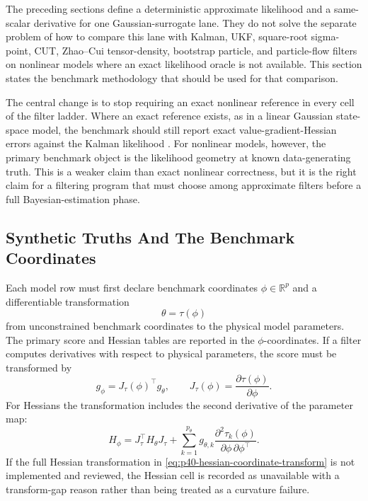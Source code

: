 \documentclass[11pt]{article}
\numberwithin{equation}{section}
\newcommand{\R}{\mathbb R}
\begin{document}
The preceding sections define a deterministic approximate likelihood and a
same-scalar derivative for one Gaussian-surrogate lane.  They do not solve the
separate problem of how to compare this lane with Kalman, UKF, square-root
sigma-point, CUT, Zhao--Cui tensor-density, bootstrap particle, and
particle-flow filters on nonlinear models where an exact likelihood oracle is
not available.  This section states the benchmark methodology that should be
used for that comparison.

The central change is to stop requiring an exact nonlinear reference in every
cell of the filter ladder.  Where an exact reference exists, as in a linear
Gaussian state-space model, the benchmark should still report exact
value-gradient-Hessian errors against the Kalman likelihood
\citep{durbin2012time}.  For nonlinear models, however, the primary benchmark
object is the likelihood geometry at known data-generating truth.  This is a
weaker claim than exact nonlinear correctness, but it is the right claim for a
filtering program that must choose among approximate filters before a full
Bayesian-estimation phase.

\subsection{Synthetic Truths And The Benchmark Coordinates}
\label{subsec:p40-synthetic-truths}

Each model row must first declare benchmark coordinates
\(\phi\in\R^p\) and a differentiable transformation
\begin{equation}
  \theta=\tau(\phi)
  \label{eq:p40-benchmark-transform}
\end{equation}
from unconstrained benchmark coordinates to the physical model parameters.  The
primary score and Hessian tables are reported in the \(\phi\)-coordinates.  If a
filter computes derivatives with respect to physical parameters, the score must
be transformed by
\begin{equation}
  g_\phi
  =
  J_\tau(\phi)^\top g_\theta,
  \qquad
  J_\tau(\phi)=\frac{\partial \tau(\phi)}{\partial \phi}.
  \label{eq:p40-score-coordinate-transform}
\end{equation}
For Hessians the transformation includes the second derivative of the parameter
map:
\begin{equation}
  H_\phi
  =
  J_\tau^\top H_\theta J_\tau
  +
  \sum_{k=1}^{p_\theta} g_{\theta,k}
  \frac{\partial^2 \tau_k(\phi)}{\partial \phi\,\partial\phi^\top}.
  \label{eq:p40-hessian-coordinate-transform}
\end{equation}
If the full Hessian transformation in
\eqref{eq:p40-hessian-coordinate-transform} is not implemented and reviewed,
the Hessian cell is recorded as unavailable with a transform-gap reason rather
than being treated as a curvature failure.
\end{document}
